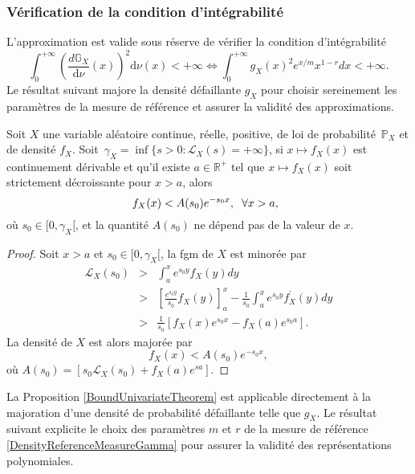 \subsubsection{Vérification de la condition d\rq{}intégrabilité}
L'approximation est valide sous réserve de vérifier la condition d'intégrabilité
\begin{equation}\label{IntegrabilityCondition}
\int_{0}^{+\infty}\left(\frac{d\mathbb{G}_{X}}{\text{d}\nu}(x)\right)^{2}\text{d}\nu(x)<+\infty\Leftrightarrow\int_{0}^{+\infty}g_{X}(x)^{2}e^{x/m}x^{1-r}dx<+\infty.
\end{equation} 
Le résultat suivant majore la densité défaillante $g_{X}$ pour choisir sereinement les paramètres de la mesure de référence et assurer la validité des approximations.
\begin{Prop}\label{BoundUnivariateTheorem}
Soit $X$ une variable aléatoire continue, réelle, positive, de loi de probabilité $\,\mathbb{P}_{X}$ et de densité $f_{X}$. Soit $\,\gamma_{X}=\inf \{s>0 : \mathcal{L}_{X}(s)=+\infty\}$, si $x\mapsto f_{X}(x)$ est continuement dérivable et qu\rq{}il existe $a\in\mathbb{R}^{+}$ tel que $x\mapsto f_{X}(x)$ soit strictement décroissante pour $x>a$, alors  
\begin{equation}
f_{X}(x)<A(s_{0})e^{-s_{0}x},\hspace{0.2cm}\forall x>a,\hspace{0.2cm}
\end{equation}
où $s_{0}\in[0,\gamma_{X}[$, et la quantité $A(s_{0})$ ne dépend pas de la valeur de $x$.
\end{Prop}
\begin{proof}
Soit $x>a$ et $s_{0}\in[0,\gamma_{X}[$, la \gls{fgm} de $X$ est minorée par
\begin{eqnarray*}
\mathcal{L}_{X}(s_{0})&>&\int_{a}^{x}e^{s_{0}y}f_{X}(y)dy\\
&>&\left[\frac{e^{s_{0}y}}{s_{0}}f_{X}(y)\right]_{a}^{x}-\frac{1}{s_{0}}\int_{a}^{x}e^{s_{0}y}f_{X}^{’}(y)dy\\
&>&\frac{1}{s_{0}}\left[f_{X}(x)e^{s_{0}x}-f_{X}(a)e^{s_{0}a}\right].
\end{eqnarray*}
La densité de $X$ est alors majorée par 
\begin{equation*}
f_{X}(x)<A(s_{0})e^{-s_{0}x},
\end{equation*}
où $A(s_{0})=\left[s_{0}\mathcal{L}_{X}(s_{0})+f_{X}(a)e^{sa}\right]$.
\end{proof}
La Proposition \ref{BoundUnivariateTheorem} est applicable directement à la majoration d\rq{}une densité de probabilité défaillante telle que $g_{X}$. Le résultat suivant explicite le choix des paramètres $m$ et $r$ de la mesure de référence \eqref{DensityReferenceMeasureGamma} pour assurer la validité des représentations polynomiales. 
